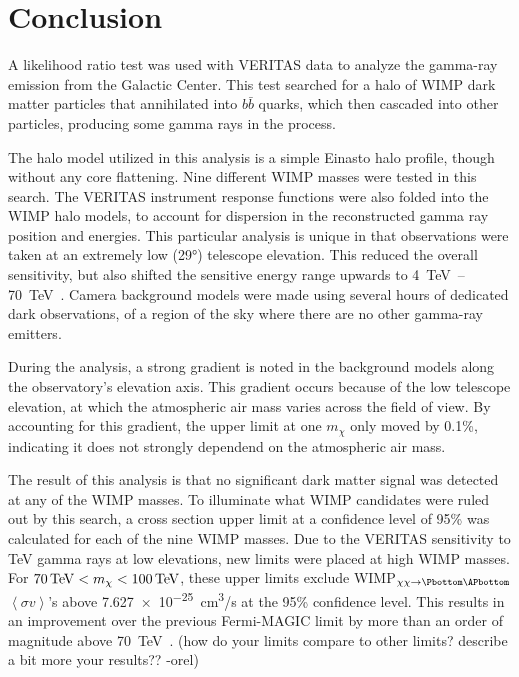 \cleartooddpage[\thispagestyle{empty}]
\chapter{Conclusion}


A likelihood ratio test was used with VERITAS data to analyze the gamma-ray emission from the Galactic Center.
This test searched for a halo of WIMP dark matter particles that annihilated into $b\bar{b}$ quarks, which then cascaded into other particles, producing some gamma rays in the process.

The halo model utilized in this analysis is a simple Einasto halo profile, though without any core flattening.
Nine different WIMP masses were tested in this search.
The VERITAS instrument response functions were also folded into the WIMP halo models, to account for dispersion in the reconstructed gamma ray position and energies.
This particular analysis is unique in that observations were taken at an extremely low (\nicetilde{}\ang{29}) telescope elevation.
This reduced the overall sensitivity, but also shifted the sensitive energy range upwards to \SIrange{4}{70}{\TeV{}}.
Camera background models were made using several hours of dedicated dark observations, of a region of the sky where there are no other gamma-ray emitters.

During the analysis, a strong gradient is noted in the background models along the observatory's elevation axis.
This gradient occurs because of the low telescope elevation, at which the atmospheric air mass varies across the field of view.
By accounting for this gradient, the upper limit at one $m_{\chi}$ only moved by 0.1\%, indicating it does not strongly dependend on the atmospheric air mass.

The result of this analysis is that no significant dark matter signal was detected at any of the WIMP masses.
To illuminate what WIMP candidates were ruled out by this search, a cross section upper limit at a confidence level of 95\% was calculated for each of the nine WIMP masses.
Due to the VERITAS sensitivity to TeV gamma rays at low elevations, new limits were placed at high WIMP masses.
For $70\,\TeV<m_{\chi}<100\,\TeV$, these upper limits exclude WIMP$_{\chi\chi\rightarrow\Pbottom\APbottom}$ $\left \langle \sigma v \right \rangle$'s above \SI{7.627e-25}{cm^3/s} at the 95\% confidence level.
This results in an improvement over the previous Fermi-MAGIC limit by more than an order of magnitude above \SI{70}{\TeV{}}.
{\color{red}(how do your limits compare to other limits? describe a bit more your results?? -orel)}

